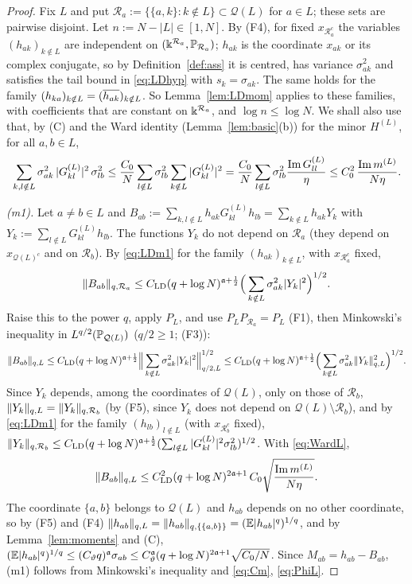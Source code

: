 \begin{proof}
Fix $L$ and put $\mathcal R_a:=\{\{a,k\}:k\notin L\}\subset\mathcal Q(L)$ for $a\in L$; these sets are pairwise disjoint. Let $n:=N-|L|\in[1,N]$. By (F4), for fixed $x_{\mathcal R_a^c}$ the variables $(h_{ak})_{k\notin L}$ are independent on $(\Bbbk^{\mathcal R_a},\mathbb{P}_{\mathcal R_a})$; $h_{ak}$ is the coordinate $x_{ak}$ or its complex conjugate, so by
Definition~\ref{def:ass} it is centred, has variance $\sigma_{ak}^2$ and satisfies the tail bound in \eqref{eq:LDhyp} with $s_k=\sigma_{ak}$. The same holds for the family $(h_{ka})_{k\notin L}=(\overline{h_{ak}})_{k\notin L}$. So Lemma~\ref{lem:LDmom} applies to these families, with coefficients that are constant on $\Bbbk^{\mathcal R_a}$,
and $\log n\le\log N$. We shall also use that, by (C) and the Ward identity (Lemma~\ref{lem:basic}(b)) for the minor $H^{(L)}$, for all $a,b\in L$,
\begin{equation}\label{eq:WardL}
 \sum_{k,l\notin L}\sigma_{ak}^2\,|G^{(L)}_{kl}|^2\,\sigma_{lb}^2\le\frac{C_0}N\sum_{l\notin L}\sigma_{lb}^2\sum_{k\notin L}|G^{(L)}_{kl}|^2=\frac{C_0}N\sum_{l\notin L}\sigma_{lb}^2\frac{\operatorname{Im} G^{(L)}_{ll}}{\eta}\le C_0^2\,\frac{\operatorname{Im} m^{(L)}}{N\eta}.
\end{equation}

\emph{(m1).} Let $a\ne b\in L$ and $B_{ab}:=\sum_{k,l\notin L}h_{ak}G^{(L)}_{kl}h_{lb}=\sum_{k\notin L}h_{ak}Y_k$ with $Y_k:=\sum_{l\notin L}G^{(L)}_{kl}h_{lb}$. The functions $Y_k$ do not depend on $\mathcal R_a$ (they depend on $x_{\mathcal Q(L)^c}$ and on $\mathcal R_b$).
By \eqref{eq:LDm1} for the family $(h_{ak})_{k\notin L}$, with $x_{\mathcal R_a^c}$ fixed,
\[
 \|B_{ab}\|_{q,\mathcal R_a}\le C_{\rm LD}(q+\log N)^{\mathfrak{a}+\frac12}\Big(\sum_{k\notin L}\sigma_{ak}^2|Y_k|^2\Big)^{1/2}.
\]
Raise this to the power $q$, apply $P_L$, and use $P_LP_{\mathcal R_a}=P_L$ (F1), then Minkowski's inequality in $L^{q/2}(\mathbb{P}_{\mathcal Q(L)})$ ($q/2\ge1$; (F3)):
\[
 \|B_{ab}\|_{q,L}\le C_{\rm LD}(q+\log N)^{\mathfrak{a}+\frac12}\Big\|\sum_{k\notin L}\sigma_{ak}^2|Y_k|^2\Big\|_{q/2,L}^{1/2}\le C_{\rm LD}(q+\log N)^{\mathfrak{a}+\frac12}\Big(\sum_{k\notin L}\sigma_{ak}^2\|Y_k\|_{q,L}^2\Big)^{1/2}.
\]
Since $Y_k$ depends, among the coordinates of $\mathcal Q(L)$, only on those of $\mathcal R_b$, $\|Y_k\|_{q,L}=\|Y_k\|_{q,\mathcal R_b}$ (by (F5), since $Y_k$ does not depend on $\mathcal Q(L)\setminus\mathcal R_b$), and by \eqref{eq:LDm1} for the family $(h_{lb})_{l\notin L}$ (with $x_{\mathcal R_b^c}$ fixed),
$\|Y_k\|_{q,\mathcal R_b}\le C_{\rm LD}(q+\log N)^{\mathfrak{a}+\frac12}(\sum_{l\notin L}|G^{(L)}_{kl}|^2\sigma_{lb}^2)^{1/2}$. With \eqref{eq:WardL},
\[
 \|B_{ab}\|_{q,L}\le C_{\rm LD}^2(q+\log N)^{2\mathfrak{a}+1}\,C_0\sqrt{\frac{\operatorname{Im} m^{(L)}}{N\eta}}.
\]
The coordinate $\{a,b\}$ belongs to $\mathcal Q(L)$ and $h_{ab}$ depends on no other coordinate, so by (F5) and (F4) $\|h_{ab}\|_{q,L}=\|h_{ab}\|_{q,\{\{a,b\}\}}=(\mathbb{E}|h_{ab}|^q)^{1/q}$, and by Lemma~\ref{lem:moments} and (C), $(\mathbb{E}|h_{ab}|^q)^{1/q}\le(C_\vartheta q)^{\mathfrak{a}}\sigma_{ab}\le C_\vartheta^{\mathfrak{a}}(q+\log N)^{2\mathfrak{a}+1}\sqrt{C_0/N}$. Since $M_{ab}=h_{ab}-B_{ab}$, (m1) follows from Minkowski's inequality and \eqref{eq:Cm}, \eqref{eq:PhiL}.


\end{proof}
